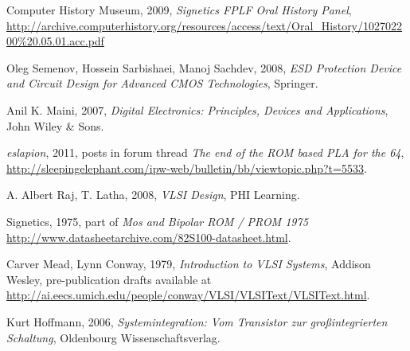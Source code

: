 Computer History Museum, 2009,
\textit{Signetics FPLF Oral History Panel},
\url{http://archive.computerhistory.org/resources/access/text/Oral_History/1027022
00\%20.05.01.acc.pdf}

 Oleg Semenov, Hossein Sarbishaei, Manoj Sachdev, 2008,
\textit{ESD Protection Device and Circuit Design for Advanced CMOS
Technologies}, Springer.

 Anil K. Maini, 2007,
\textit{Digital Electronics: Principles, Devices and Applications},
John Wiley \& Sons.

 \textit{eslapion}, 2011, posts in forum thread
\textit{The end of the ROM based PLA for the 64},
\url{http://sleepingelephant.com/ipw-web/bulletin/bb/viewtopic.php?t=5533}.

 A. Albert Raj, T. Latha, 2008,
\textit{VLSI Design}, PHI Learning.

 Signetics, 1975, 
part of \textit{Mos and Bipolar ROM / PROM 1975}
\url{http://www.datasheetarchive.com/82S100-datasheet.html}.

 Carver Mead, Lynn Conway, 1979, 
\textit{Introduction to VLSI Systems}, Addison Wesley,
pre-publication drafts available at
\url{http://ai.eecs.umich.edu/people/conway/VLSI/VLSIText/VLSIText.html}.

 Kurt Hoffmann, 2006,
\textit{Systemintegration: Vom Transistor zur groß\-integrierten Schaltung},
Oldenbourg Wissenschaftsverlag.


